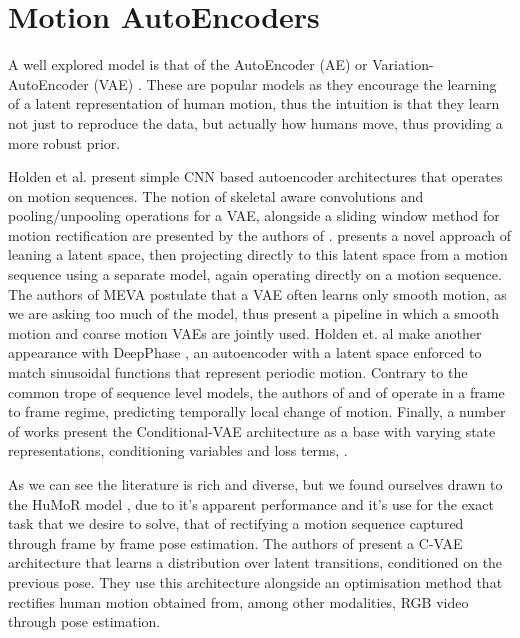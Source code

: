 \section{Motion AutoEncoders}

A well explored model is that of the AutoEncoder (AE) \cite{bank2021_autoencoders} or Variation-AutoEncoder (VAE) \cite{kingma2022_VAE}. These are popular models as they encourage the learning of a latent representation \cite{bank2021_autoencoders} of human motion, thus the intuition is that they learn not just to reproduce the data, but actually how humans move, thus providing a more robust prior.


Holden et al. \cite{ConvAutoEnv2015} \cite{ConvAutoEnv2016} present simple CNN based autoencoder architectures that operates on motion sequences. The notion of skeletal aware convolutions and pooling/unpooling operations for a VAE, alongside a sliding window method for motion rectification are presented by the authors of \cite{HierarchicalMotionVAE}. \cite{TransformerVAEPrior} presents a novel approach of leaning a latent space, then projecting directly to this latent space from a motion sequence using a separate model, again operating directly on a motion sequence. The authors of MEVA \cite{MEVA} postulate that a VAE often learns only smooth motion, as we are asking too much of the model, thus present a pipeline in which a smooth motion and coarse motion VAEs are jointly used. Holden et. al make another appearance with DeepPhase \cite{DeepPhase}, an autoencoder with a latent space enforced to match sinusoidal functions that represent periodic motion. Contrary to the common trope of sequence level models, the authors of \cite{learnedInbetweening} and of \cite{MotionVAE} operate in a frame to frame regime, predicting temporally local change of motion. Finally, a number of works present the Conditional-VAE architecture \cite{CVAE} as a base with varying state representations, conditioning variables and loss terms, \cite{humor, learnedInbetweening, MotionVAE, structured4Dlatentspace}.

As we can see the literature is rich and diverse, but we found ourselves drawn to the HuMoR model \cite{humor}, due to it's apparent performance and it's use for the exact task that we desire to solve, that of rectifying a motion sequence captured through frame by frame pose estimation. The authors of \cite{humor} present a C-VAE architecture that learns a distribution over latent transitions, conditioned on the previous pose. They use this architecture alongside an optimisation method that rectifies human motion obtained from, among other modalities, RGB video through pose estimation.

